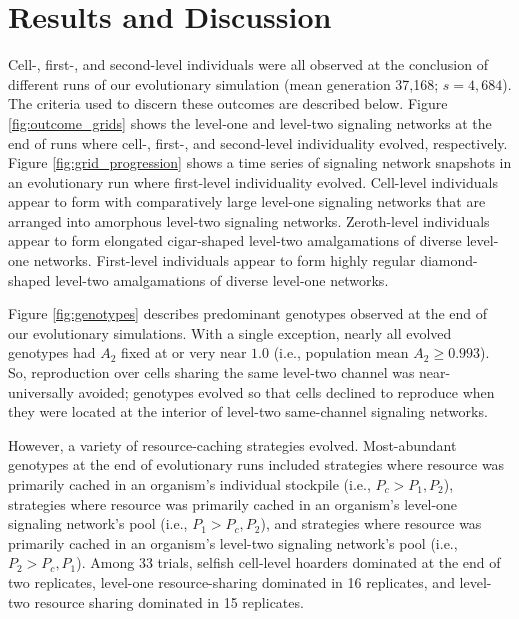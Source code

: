 \section{Results and Discussion}











Cell-, first-, and second-level individuals were all observed at the conclusion of different runs of our evolutionary simulation (mean generation 37,168; $s=4,684$).
The criteria used to discern these outcomes are described below.
Figure \ref{fig:outcome_grids} shows the level-one and level-two signaling networks at the end of runs where cell-, first-, and second-level individuality evolved, respectively.
Figure \ref{fig:grid_progression} shows a time series of signaling network snapshots in an evolutionary run where first-level individuality evolved.
Cell-level individuals appear to form with comparatively large level-one signaling networks that are arranged into amorphous level-two signaling networks.
Zeroth-level individuals appear to form elongated cigar-shaped level-two amalgamations of diverse level-one networks.
First-level individuals appear to form highly regular diamond-shaped level-two amalgamations of diverse level-one networks.

Figure \ref{fig:genotypes} describes predominant genotypes observed at the end of our evolutionary simulations.
With a single exception, nearly all evolved genotypes had $A_2$ fixed at or very near $1.0$ (i.e., population mean $A_2 \geq 0.993$).
So, reproduction over cells sharing the same level-two channel was near-universally avoided;
genotypes evolved so that cells declined to reproduce when they were located at the interior of level-two same-channel signaling networks.

However, a variety of resource-caching strategies evolved.
Most-abundant genotypes at the end of evolutionary runs included strategies where resource was primarily cached in an organism's individual stockpile (i.e., $P_{c} > P_1, P_2$), strategies where resource was primarily cached in an organism's level-one signaling network's pool (i.e., $P_1 > P_{c}, P_2$), and strategies where resource was primarily cached in an organism's level-two signaling network's pool (i.e., $P_2 > P_{c}, P_1$).
Among 33 trials, selfish cell-level hoarders dominated at the end of two replicates, level-one resource-sharing dominated in 16 replicates, and level-two resource sharing dominated in 15 replicates.

